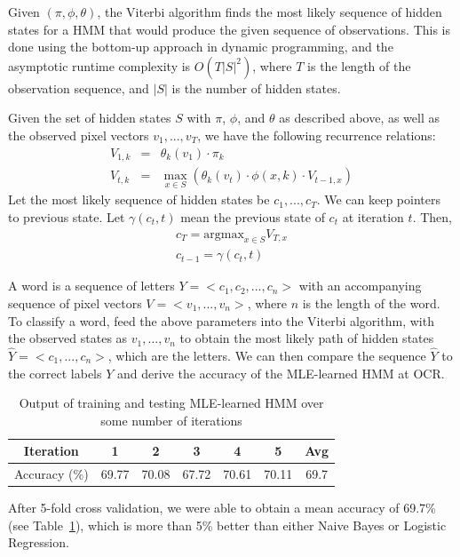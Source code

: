 \documentclass{article} %
\begin{document}
Given $(\pi, \phi, \theta)$, the Viterbi algorithm finds the most likely sequence of hidden states for a HMM that would produce the given sequence of observations. This is done using the bottom-up approach in dynamic programming, and the asymptotic runtime complexity is $O(T|S|^2)$, where $T$ is the length of the observation sequence, and $|S|$ is the number of hidden states.

Given the set of hidden states $S$ with $\pi$, $\phi$, and $\theta$ as described above, as well as the observed pixel vectors $v_1, ..., v_T$, we have the following recurrence relations:
\begin{eqnarray*}
	V_{1,k} &=& \theta_k(v_1) \cdot \pi_k \\
	V_{t,k} &=& \max_{x \in S} \left( \theta_k (v_t) \cdot \phi(x,k) \cdot V_{t-1,x} \right)
\end{eqnarray*}
Let the most likely sequence of hidden states be $c_1, ..., c_T$. We can keep pointers to previous state. Let $\gamma(c_t, t)$ mean the previous state of $c_t$ at iteration $t$. Then,
\begin{eqnarray*}
	c_T = \mbox{argmax}_{x \in S} V_{T,x} \\
	c_{t-1} = \gamma(c_t, t)
\end{eqnarray*}

A word is a sequence of letters $Y = <c_1, c_2, ..., c_n>$ with an accompanying sequence of pixel vectors $V = <v_1, ..., v_n>$, where $n$ is the length of the word. To classify a word, feed the above parameters into the Viterbi algorithm, with the observed states as $v_1, ..., v_n$ to obtain the most likely path of hidden states $\hat{Y} = <c_1, ..., c_n>$, which are the letters. We can then compare the sequence $\hat{Y}$ to the correct labels $Y$ and derive the accuracy of the MLE-learned HMM at OCR.

\begin{table}[h]
\centering
\begin{tabular}{|c|c|c|c|c|c|c|}
\hline
Iteration & 1 & 2 & 3 & 4 & 5 & Avg \\
\hline 
Accuracy (\%) & 69.77 & 70.08 & 67.72 & 70.61 & 70.11 & 69.7 \\
\hline 
\end{tabular}
\caption{Output of training and testing MLE-learned HMM over some number of iterations}
\label{tab:mle-hmm-results}
\end{table}

After 5-fold cross validation, we were able to obtain a mean accuracy of 69.7\% (see Table~\ref{tab:mle-hmm-results}), which is more than 5\% better than either Naive Bayes or Logistic Regression.\\
\end{document}
